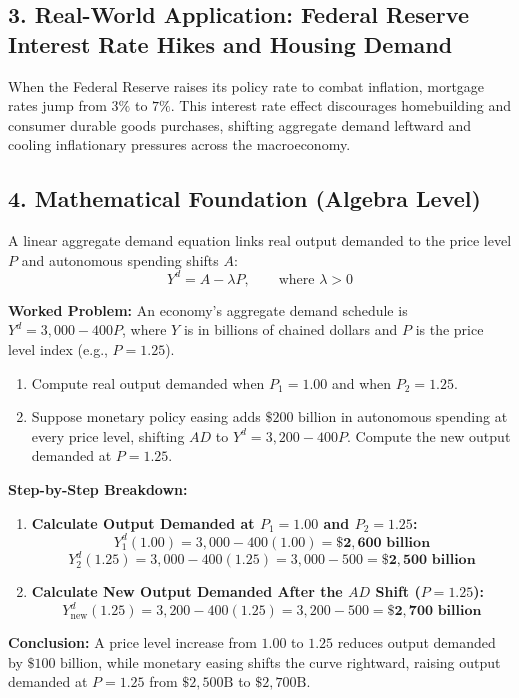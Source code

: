 \documentclass[11pt,letterpaper]{article}
\begin{document}
\subsection*{3. Real-World Application: Federal Reserve Interest Rate Hikes and Housing Demand}
When the Federal Reserve raises its policy rate to combat inflation, mortgage rates jump from $3\%$ to $7\%$. This interest rate effect discourages homebuilding and consumer durable goods purchases, shifting aggregate demand leftward and cooling inflationary pressures across the macroeconomy.

\subsection*{4. Mathematical Foundation (Algebra Level)}
A linear aggregate demand equation links real output demanded to the price level $P$ and autonomous spending shifts $A$:
\begin{equation}
Y^d = A - \lambda P, \qquad \text{where } \lambda > 0
\end{equation}

\noindent\textbf{Worked Problem:}
An economy's aggregate demand schedule is $Y^d = 3{,}000 - 400P$, where $Y$ is in billions of chained dollars and $P$ is the price level index (e.g., $P = 1.25$).
\begin{enumerate}
    \item Compute real output demanded when $P_1 = 1.00$ and when $P_2 = 1.25$.
    \item Suppose monetary policy easing adds $\$200\text{ billion}$ in autonomous spending at every price level, shifting $AD$ to $Y^d = 3{,}200 - 400P$. Compute the new output demanded at $P = 1.25$.
\end{enumerate}

\noindent\textbf{Step-by-Step Breakdown:}
\begin{enumerate}
    \item \textbf{Calculate Output Demanded at $P_1 = 1.00$ and $P_2 = 1.25$:}
    \[
    Y_1^d(1.00) = 3{,}000 - 400(1.00) = \mathbf{\$2{,}600\text{ billion}}
    \]
    \[
    Y_2^d(1.25) = 3{,}000 - 400(1.25) = 3{,}000 - 500 = \mathbf{\$2{,}500\text{ billion}}
    \]

    \item \textbf{Calculate New Output Demanded After the $AD$ Shift ($P = 1.25$):}
    \[
    Y^d_{\text{new}}(1.25) = 3{,}200 - 400(1.25) = 3{,}200 - 500 = \mathbf{\$2{,}700\text{ billion}}
    \]
\end{enumerate}
\textbf{Conclusion:} A price level increase from $1.00$ to $1.25$ reduces output demanded by $\$100\text{ billion}$, while monetary easing shifts the curve rightward, raising output demanded at $P = 1.25$ from $\$2{,}500\text{B}$ to $\$2{,}700\text{B}$.
\end{document}
